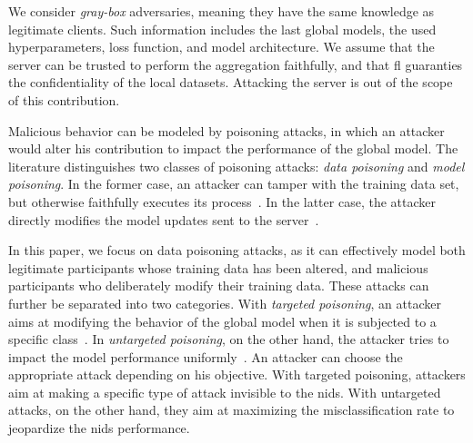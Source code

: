We consider \emph{gray-box} adversaries, meaning they have the same knowledge as legitimate clients.
Such information includes the last global models, the used hyperparameters, loss function, and model architecture. 
We assume that the server can be trusted to perform the aggregation faithfully, and that \gls{fl} guaranties the confidentiality of the local datasets. 
Attacking the server is out of the scope of this contribution. 

Malicious behavior can be modeled by poisoning attacks, in which an attacker would alter his contribution to impact the performance of the global model.
The literature distinguishes two classes of poisoning attacks: \textit{data poisoning} and \textit{model poisoning}. 
In the former case, an attacker can tamper with the training data set, but otherwise faithfully executes its process~\cite{awan_contra_2021,fung_limitations_2020}.
In the latter case, the attacker directly modifies the model updates sent to the server~\cite{fang_local_2020,tolpegin_data_2020,bhagoji_analyzing_2019}.

In this paper, we focus on data poisoning attacks, as it can effectively model both legitimate participants whose training data has been altered, and malicious participants who deliberately modify their training data.
These attacks can further be separated into two categories.
With \emph{targeted poisoning}, an attacker aims at modifying the behavior of the global model when it is subjected to a specific class~\cite{fung_limitations_2020}.
In \emph{untargeted poisoning}, on the other hand, the attacker tries to impact the model performance uniformly~\cite{cao_fltrust_2022}. %
%
%
An attacker can choose the appropriate attack depending on his objective.
With targeted poisoning, attackers aim at making a specific type of attack invisible to the \gls{nids}.
With untargeted attacks, on the other hand, they aim at maximizing the misclassification rate to jeopardize the \gls{nids} performance. %





